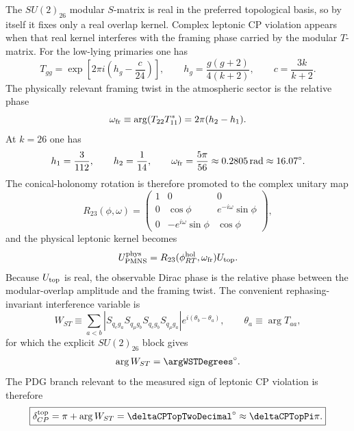 \documentclass[11pt]{article}
\begin{document}
The $SU(2)_{26}$ modular $S$-matrix is real in the preferred topological basis, so by itself it fixes only a real overlap kernel. Complex leptonic CP violation appears when that real kernel interferes with the framing phase carried by the modular $T$-matrix. For the low-lying primaries one has
\begin{equation}
 T_{gg} = \exp\!\left[2\pi i\left(h_g-\frac{c}{24}\right)\right],
 \qquad
 h_g = \frac{g(g+2)}{4(k+2)},
 \qquad
 c = \frac{3k}{k+2}.
\end{equation}
The physically relevant framing twist in the atmospheric sector is the relative phase
\begin{equation}
 \omega_{\rm fr} \equiv \arg\!\left(T_{22}T_{11}^{*}\right)=2\pi(h_2-h_1).
\end{equation}
At $k=26$ one has
\begin{equation}
 h_1=\frac{3}{112},
 \qquad
 h_2=\frac{1}{14},
 \qquad
 \omega_{\rm fr}=\frac{5\pi}{56}\approx0.2805\,\mathrm{rad}\approx16.07^{\circ}.
\end{equation}
The conical-holonomy rotation is therefore promoted to the complex unitary map
\begin{equation}
 R_{23}(\phi,\omega)=
 \begin{pmatrix}
 1 & 0 & 0 \\
 0 & \cos\phi & e^{-i\omega}\sin\phi \\
 0 & -e^{i\omega}\sin\phi & \cos\phi
 \end{pmatrix},
\end{equation}
and the physical leptonic kernel becomes
\begin{equation}
 U_{\rm PMNS}^{\rm phys}=R_{23}(\phi_{RT}^{\rm hol},\omega_{\rm fr})U_{\rm top}.
\end{equation}
Because $U_{\rm top}$ is real, the observable Dirac phase is the relative phase between the modular-overlap amplitude and the framing twist. The convenient rephasing-invariant interference variable is
\begin{equation}
 W_{ST}
 \equiv
 \sum_{a<b}
 \left|S_{q_e g_a}S_{q_{\mu} g_b}S_{q_e g_b}S_{q_{\mu} g_a}\right|
 e^{i(\theta_b-\theta_a)},
 \qquad
 \theta_a\equiv\arg T_{aa},
\end{equation}
for which the explicit $SU(2)_{26}$ block gives
\begin{equation}
 \arg W_{ST}=\argWSTDegrees^{\circ}.
\end{equation}
The PDG branch relevant to the measured sign of leptonic CP violation is therefore
\begin{equation}
 \boxed{\delta_{CP}^{\rm top}=\pi+\arg W_{ST}=\deltaCPTopTwoDecimal^{\circ}\approx\deltaCPTopPi\pi.}
\end{equation}
\end{document}
